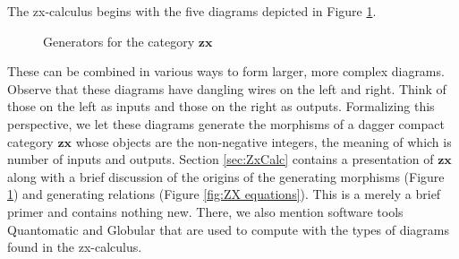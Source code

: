 \documentclass[]{amsart}
\theoremstyle{defn}
\begin{document}
The zx-calculus begins with the five diagrams depicted in Figure \ref{fig:ZX generators}.
\begin{figure}
	\caption{Generators for the category $\mathbf{zx}$}
	\label{fig:ZX generators}
\end{figure}
These can be combined in various ways to form larger, more complex diagrams.   Observe that these diagrams have dangling wires on the left and right. Think of those on the left as inputs and those on the right as outputs.  Formalizing this perspective, we let these diagrams generate the morphisms of a dagger compact category $\mathbf{zx}$ whose objects are the non-negative integers, the meaning of which is number of inputs and outputs.  Section \ref{sec:ZxCalc} contains a presentation of $\mathbf{zx}$ along with a brief discussion of the origins of the generating morphisms (Figure \ref{fig:ZX generators}) and generating relations (Figure \ref{fig:ZX equations}). This is a merely a brief primer and contains nothing new.  There, we also mention software tools Quantomatic \cite{BarKissingerVicary_Globular,DixonDuncanKissinger_QuantomaticWebsite} and Globular \cite{BarKissingerVicary_Globular} that are used to compute with the types of diagrams found in the zx-calculus.  
\end{document}

